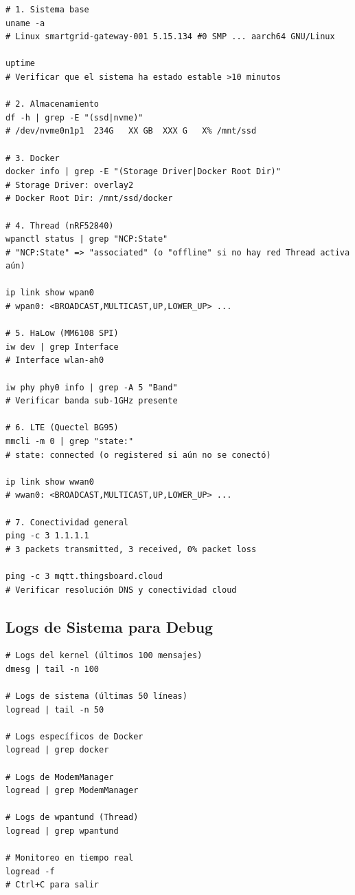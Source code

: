 \begin{verbatim}
# 1. Sistema base
uname -a
# Linux smartgrid-gateway-001 5.15.134 #0 SMP ... aarch64 GNU/Linux

uptime
# Verificar que el sistema ha estado estable >10 minutos

# 2. Almacenamiento
df -h | grep -E "(ssd|nvme)"
# /dev/nvme0n1p1  234G   XX GB  XXX G   X% /mnt/ssd

# 3. Docker
docker info | grep -E "(Storage Driver|Docker Root Dir)"
# Storage Driver: overlay2
# Docker Root Dir: /mnt/ssd/docker

# 4. Thread (nRF52840)
wpanctl status | grep "NCP:State"
# "NCP:State" => "associated" (o "offline" si no hay red Thread activa aún)

ip link show wpan0
# wpan0: <BROADCAST,MULTICAST,UP,LOWER_UP> ...

# 5. HaLow (MM6108 SPI)
iw dev | grep Interface
# Interface wlan-ah0

iw phy phy0 info | grep -A 5 "Band"
# Verificar banda sub-1GHz presente

# 6. LTE (Quectel BG95)
mmcli -m 0 | grep "state:"
# state: connected (o registered si aún no se conectó)

ip link show wwan0
# wwan0: <BROADCAST,MULTICAST,UP,LOWER_UP> ...

# 7. Conectividad general
ping -c 3 1.1.1.1
# 3 packets transmitted, 3 received, 0% packet loss

ping -c 3 mqtt.thingsboard.cloud
# Verificar resolución DNS y conectividad cloud
\end{verbatim}

\subsection{Logs de Sistema para Debug}

\begin{verbatim}
# Logs del kernel (últimos 100 mensajes)
dmesg | tail -n 100

# Logs de sistema (últimas 50 líneas)
logread | tail -n 50

# Logs específicos de Docker
logread | grep docker

# Logs de ModemManager
logread | grep ModemManager

# Logs de wpantund (Thread)
logread | grep wpantund

# Monitoreo en tiempo real
logread -f
# Ctrl+C para salir
\end{verbatim}

